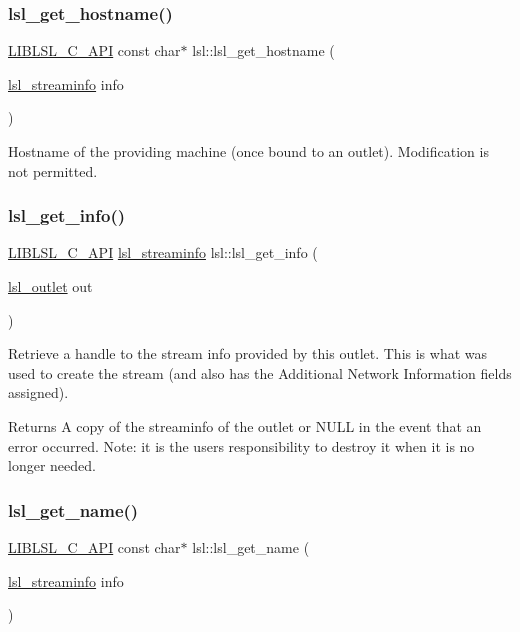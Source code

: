 \subsubsection{\texorpdfstring{lsl\+\_\+get\+\_\+hostname()}{lsl\_get\_hostname()}}
{\footnotesize\ttfamily \hyperlink{lsl__cpp_8h_aafd0ef1813e8be84a1420c4f1df64615}{L\+I\+B\+L\+S\+L\+\_\+\+C\+\_\+\+A\+PI} const char$\ast$ lsl\+::lsl\+\_\+get\+\_\+hostname (\begin{DoxyParamCaption}\item[{\hyperlink{namespacelsl_aa0a9ce9956061679949daa2e35aae2e8}{lsl\+\_\+streaminfo}}]{info }\end{DoxyParamCaption})}

Hostname of the providing machine (once bound to an outlet). Modification is not permitted. \mbox{\label{namespacelsl_add36e044b2c854296d26dbe429ef0445}} 
\subsubsection{\texorpdfstring{lsl\+\_\+get\+\_\+info()}{lsl\_get\_info()}}
{\footnotesize\ttfamily \hyperlink{lsl__cpp_8h_aafd0ef1813e8be84a1420c4f1df64615}{L\+I\+B\+L\+S\+L\+\_\+\+C\+\_\+\+A\+PI} \hyperlink{namespacelsl_aa0a9ce9956061679949daa2e35aae2e8}{lsl\+\_\+streaminfo} lsl\+::lsl\+\_\+get\+\_\+info (\begin{DoxyParamCaption}\item[{\hyperlink{namespacelsl_abcf512b0f66dacf86c10b165995fd50b}{lsl\+\_\+outlet}}]{out }\end{DoxyParamCaption})}

Retrieve a handle to the stream info provided by this outlet. This is what was used to create the stream (and also has the Additional Network Information fields assigned). \begin{DoxyReturn}{Returns}
A copy of the streaminfo of the outlet or N\+U\+LL in the event that an error occurred. Note\+: it is the user\textquotesingle{}s responsibility to destroy it when it is no longer needed. 
\end{DoxyReturn}
\mbox{\label{namespacelsl_ad356f55776a73d03998837c5c32fc95e}} 
\subsubsection{\texorpdfstring{lsl\+\_\+get\+\_\+name()}{lsl\_get\_name()}}
{\footnotesize\ttfamily \hyperlink{lsl__cpp_8h_aafd0ef1813e8be84a1420c4f1df64615}{L\+I\+B\+L\+S\+L\+\_\+\+C\+\_\+\+A\+PI} const char$\ast$ lsl\+::lsl\+\_\+get\+\_\+name (\begin{DoxyParamCaption}\item[{\hyperlink{namespacelsl_aa0a9ce9956061679949daa2e35aae2e8}{lsl\+\_\+streaminfo}}]{info }\end{DoxyParamCaption})}

